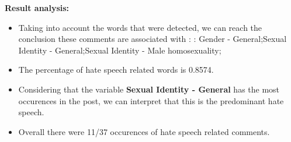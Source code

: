 \documentclass[11pt]{article}
\begin{document}
\textbf{\Large Result analysis:}

\begin{itemize}\item Taking into account the words that were detected, we can reach the conclusion these comments are associated with : : Gender - General;Sexual Identity - General;Sexual Identity - Male homosexuality;%

\item The percentage of hate speech related words is 0.8574.

\item Considering that the variable \textbf{Sexual Identity - General} has the most occurences in the post, we can interpret that this is the predominant hate speech.

\item Overall there were 11/37 occurences of hate speech related comments.\end{itemize}
\end{document}
